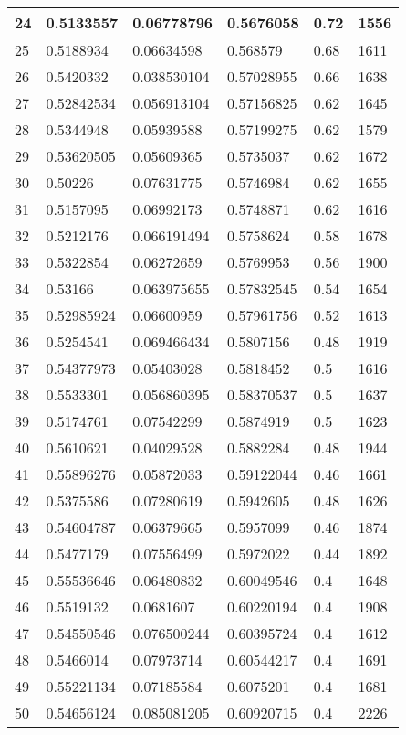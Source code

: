 \begin{longtable}{|l|l|l|l|l|l|}
24 & 0.5133557 & 0.06778796 & 0.5676058 & 0.72 & 1556 \\ \hline 
25 & 0.5188934 & 0.06634598 & 0.568579 & 0.68 & 1611 \\ \hline 
26 & 0.5420332 & 0.038530104 & 0.57028955 & 0.66 & 1638 \\ \hline 
27 & 0.52842534 & 0.056913104 & 0.57156825 & 0.62 & 1645 \\ \hline 
28 & 0.5344948 & 0.05939588 & 0.57199275 & 0.62 & 1579 \\ \hline 
29 & 0.53620505 & 0.05609365 & 0.5735037 & 0.62 & 1672 \\ \hline 
30 & 0.50226 & 0.07631775 & 0.5746984 & 0.62 & 1655 \\ \hline 
31 & 0.5157095 & 0.06992173 & 0.5748871 & 0.62 & 1616 \\ \hline 
32 & 0.5212176 & 0.066191494 & 0.5758624 & 0.58 & 1678 \\ \hline 
33 & 0.5322854 & 0.06272659 & 0.5769953 & 0.56 & 1900 \\ \hline 
34 & 0.53166 & 0.063975655 & 0.57832545 & 0.54 & 1654 \\ \hline 
35 & 0.52985924 & 0.06600959 & 0.57961756 & 0.52 & 1613 \\ \hline 
36 & 0.5254541 & 0.069466434 & 0.5807156 & 0.48 & 1919 \\ \hline 
37 & 0.54377973 & 0.05403028 & 0.5818452 & 0.5 & 1616 \\ \hline 
38 & 0.5533301 & 0.056860395 & 0.58370537 & 0.5 & 1637 \\ \hline 
39 & 0.5174761 & 0.07542299 & 0.5874919 & 0.5 & 1623 \\ \hline 
40 & 0.5610621 & 0.04029528 & 0.5882284 & 0.48 & 1944 \\ \hline 
41 & 0.55896276 & 0.05872033 & 0.59122044 & 0.46 & 1661 \\ \hline 
42 & 0.5375586 & 0.07280619 & 0.5942605 & 0.48 & 1626 \\ \hline 
43 & 0.54604787 & 0.06379665 & 0.5957099 & 0.46 & 1874 \\ \hline 
44 & 0.5477179 & 0.07556499 & 0.5972022 & 0.44 & 1892 \\ \hline 
45 & 0.55536646 & 0.06480832 & 0.60049546 & 0.4 & 1648 \\ \hline 
46 & 0.5519132 & 0.0681607 & 0.60220194 & 0.4 & 1908 \\ \hline 
47 & 0.54550546 & 0.076500244 & 0.60395724 & 0.4 & 1612 \\ \hline 
48 & 0.5466014 & 0.07973714 & 0.60544217 & 0.4 & 1691 \\ \hline 
49 & 0.55221134 & 0.07185584 & 0.6075201 & 0.4 & 1681 \\ \hline 
50 & 0.54656124 & 0.085081205 & 0.60920715 & 0.4 & 2226 \\ \hline 
\end{longtable}
